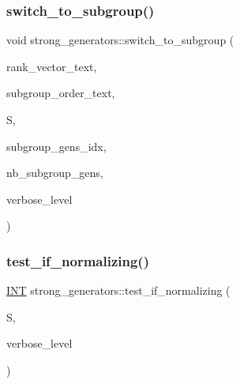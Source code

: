 \mbox{\label{classstrong__generators_ac08fd2bdfc8603376339c9590e43bdfb}} 
\subsubsection{\texorpdfstring{switch\+\_\+to\+\_\+subgroup()}{switch\_to\_subgroup()}}
{\footnotesize\ttfamily void strong\+\_\+generators\+::switch\+\_\+to\+\_\+subgroup (\begin{DoxyParamCaption}\item[{const \mbox{\hyperlink{galois_8h_ab6cc7b4aeb6ea31aba2b3fbfc83ff5e6}{B\+Y\+TE}} $\ast$}]{rank\+\_\+vector\+\_\+text,  }\item[{const \mbox{\hyperlink{galois_8h_ab6cc7b4aeb6ea31aba2b3fbfc83ff5e6}{B\+Y\+TE}} $\ast$}]{subgroup\+\_\+order\+\_\+text,  }\item[{\mbox{\hyperlink{classsims}{sims}} $\ast$}]{S,  }\item[{\mbox{\hyperlink{galois_8h_a09fddde158a3a20bd2dcadb609de11dc}{I\+NT}} $\ast$\&}]{subgroup\+\_\+gens\+\_\+idx,  }\item[{\mbox{\hyperlink{galois_8h_a09fddde158a3a20bd2dcadb609de11dc}{I\+NT}} \&}]{nb\+\_\+subgroup\+\_\+gens,  }\item[{\mbox{\hyperlink{galois_8h_a09fddde158a3a20bd2dcadb609de11dc}{I\+NT}}}]{verbose\+\_\+level }\end{DoxyParamCaption})}

\mbox{\label{classstrong__generators_a472494f5bfd24266ade4ad4c0d072be1}} 
\subsubsection{\texorpdfstring{test\+\_\+if\+\_\+normalizing()}{test\_if\_normalizing()}}
{\footnotesize\ttfamily \mbox{\hyperlink{galois_8h_a09fddde158a3a20bd2dcadb609de11dc}{I\+NT}} strong\+\_\+generators\+::test\+\_\+if\+\_\+normalizing (\begin{DoxyParamCaption}\item[{\mbox{\hyperlink{classsims}{sims}} $\ast$}]{S,  }\item[{\mbox{\hyperlink{galois_8h_a09fddde158a3a20bd2dcadb609de11dc}{I\+NT}}}]{verbose\+\_\+level }\end{DoxyParamCaption})}

